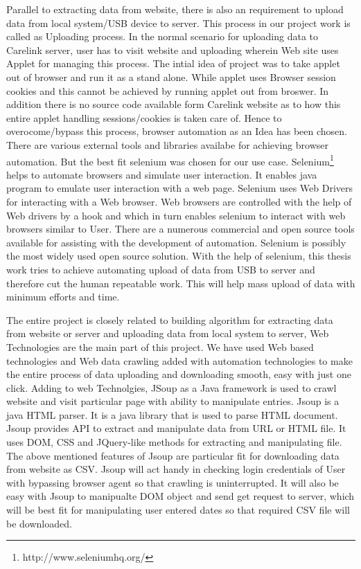 \documentclass[article,type=msc,colorback,accentcolor=tud9c,twoside,11pt]{tudthesis}
\begin{document}
Parallel to extracting data from website, there is also an requirement to upload data from local system/USB device to server. This process in our project work is called as Uploading process. In the normal scenario for uploading data to Carelink server, user has to visit website and uploading wherein Web site uses Applet for managing this process. The intial idea of project was to take applet out of browser and run it as a stand alone. While applet uses Browser session cookies and this cannot be achieved by running applet out from broswer. In addition there is no source code available form Carelink website as to how this entire applet handling sessions/cookies is taken care of. Hence to overocome/bypass this process, browser automation as an Idea has been chosen. There are various external tools and libraries availabe for achieving browser automation. But the best fit selenium  was chosen for our use case. Selenium\footnote{http://www.seleniumhq.org/} helps to automate browsers and simulate user interaction. It enables java program to emulate user interaction with a web page. Selenium\cite{Webdriver} uses Web Drivers for interacting with a Web browser. Web browsers are controlled with the help of Web drivers by a hook and which in turn enables selenium to interact with web browsers similar to User. There are a numerous commercial and open source tools available for assisting with the development of automation. Selenium is possibly the most widely used open source solution. With the help of selenium, this thesis work tries to achieve automating upload of data from USB to server and therefore cut the human repeatable work. This will help mass upload of data with minimum efforts and time.

The entire project is closely related to building algorithm for extracting data from website or server and uploading data from local system to server, Web Technologies are the main part of this project. We have used Web based technologies and Web data crawling added with automation technologies to make the entire process of data uploading and downloading smooth, easy with just one click. Adding to web Technolgies, JSoup\cite{Jsoup} as a Java framework is used to crawl website and visit particular page with ability to manipulate entries. Jsoup is a java HTML parser. It is a java library that is used to parse HTML\cite{BeaqleJSHTML} document. Jsoup provides API to extract and manipulate data from URL or HTML file. It uses DOM, CSS and JQuery-like methods for extracting and manipulating file. The above mentioned features of Jsoup are particular fit for downloading data from website as CSV. Jsoup will act handy in checking login credentials of User with bypassing browser agent so that crawling is uninterrupted. It will also be easy with Jsoup to manipualte DOM object and send get request to server, which will be best fit for manipulating user entered dates so that required CSV file will be downloaded. 
\end{document}
